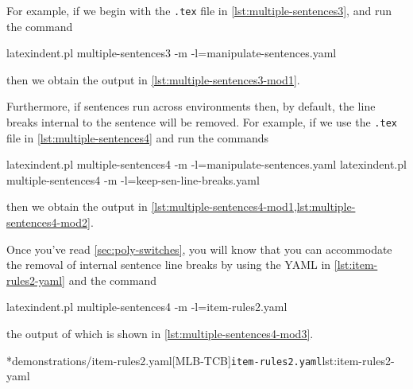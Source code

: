	For example, if we begin with the \texttt{.tex} file in
	\cref{lst:multiple-sentences3}, and run the command
	\begin{commandshell}
latexindent.pl multiple-sentences3 -m -l=manipulate-sentences.yaml
\end{commandshell}
	then we obtain the output in \cref{lst:multiple-sentences3-mod1}. 

	Furthermore, if sentences run across environments then, by default, the line breaks
	internal to the sentence will be removed. For example, if we use the
	\texttt{.tex} file in \cref{lst:multiple-sentences4} and run the commands
	\begin{commandshell}
latexindent.pl multiple-sentences4 -m -l=manipulate-sentences.yaml
latexindent.pl multiple-sentences4 -m -l=keep-sen-line-breaks.yaml
\end{commandshell}
	then we obtain the output in \cref{lst:multiple-sentences4-mod1,lst:multiple-sentences4-mod2}. 
	\begin{widepage}
	\end{widepage}
	Once you've read \cref{sec:poly-switches}, you will know that you can accommodate the
	removal of internal sentence line breaks by using the YAML in \cref{lst:item-rules2-yaml}
	and the command
	\begin{commandshell}
latexindent.pl multiple-sentences4 -m -l=item-rules2.yaml
\end{commandshell}
	the output of which is shown in \cref{lst:multiple-sentences4-mod3}.

	\begin{cmhtcbraster}
		\cmhlistingsfromfile[style=yaml-LST]*{demonstrations/item-rules2.yaml}[MLB-TCB]{\texttt{item-rules2.yaml}}{lst:item-rules2-yaml}
	\end{cmhtcbraster}

